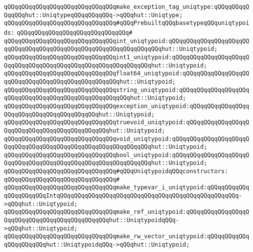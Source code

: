 \verb|qQQqqQQqqQQqqQQqqQQqqQQqqQQqqQQqmake_exception_tag_uniqtype:qQQqqQQqqQQqqQQqhut::UniqtypeqQQqqQQqqQQq->qQQqhut::Uniqtype;|\newline
\newline
\verb|qQQqqQQqqQQqqQQqqQQqqQQqqQQqqQQq#qQQqPrebuiltqQQqbasetypeqQQquniqtypoids:|\newline
\verb|qQQqqQQqqQQqqQQqqQQqqQQqqQQqqQQq#|\newline
\verb|qQQqqQQqqQQqqQQqqQQqqQQqqQQqqQQqint_uniqtypoid:qQQqqQQqqQQqqQQqqQQqqQQqqQQqqQQqqQQqqQQqqQQqqQQqqQQqqQQqqQQqqQQqqQQqhut::Uniqtypoid;|\newline
\verb|qQQqqQQqqQQqqQQqqQQqqQQqqQQqqQQqint1_uniqtypoid:qQQqqQQqqQQqqQQqqQQqqQQqqQQqqQQqqQQqqQQqqQQqqQQqqQQqqQQqqQQqqQQqhut::Uniqtypoid;|\newline
\verb|qQQqqQQqqQQqqQQqqQQqqQQqqQQqqQQqfloat64_uniqtypoid:qQQqqQQqqQQqqQQqqQQqqQQqqQQqqQQqqQQqqQQqqQQqqQQqqQQqhut::Uniqtypoid;|\newline
\verb|qQQqqQQqqQQqqQQqqQQqqQQqqQQqqQQqstring_uniqtypoid:qQQqqQQqqQQqqQQqqQQqqQQqqQQqqQQqqQQqqQQqqQQqqQQqqQQqqQQqhut::Uniqtypoid;|\newline
\verb|qQQqqQQqqQQqqQQqqQQqqQQqqQQqqQQqexception_uniqtypoid:qQQqqQQqqQQqqQQqqQQqqQQqqQQqqQQqqQQqqQQqqQQqhut::Uniqtypoid;|\newline
\verb|qQQqqQQqqQQqqQQqqQQqqQQqqQQqqQQqtruevoid_uniqtypoid:qQQqqQQqqQQqqQQqqQQqqQQqqQQqqQQqqQQqqQQqqQQqqQQqhut::Uniqtypoid;|\newline
\verb|qQQqqQQqqQQqqQQqqQQqqQQqqQQqqQQqvoid_uniqtypoid:qQQqqQQqqQQqqQQqqQQqqQQqqQQqqQQqqQQqqQQqqQQqqQQqqQQqqQQqqQQqqQQqhut::Uniqtypoid;|\newline
\verb|qQQqqQQqqQQqqQQqqQQqqQQqqQQqqQQqbool_uniqtypoid:qQQqqQQqqQQqqQQqqQQqqQQqqQQqqQQqqQQqqQQqqQQqqQQqqQQqqQQqqQQqqQQqhut::Uniqtypoid;|\newline
\newline
\verb|qQQqqQQqqQQqqQQqqQQqqQQqqQQqqQQq#qQQqUniqtypoidqQQqconstructors:|\newline
\verb|qQQqqQQqqQQqqQQqqQQqqQQqqQQqqQQq#|\newline
\verb|qQQqqQQqqQQqqQQqqQQqqQQqqQQqqQQqmake_typevar_i_uniqtypoid:qQQqqQQqqQQqqQQqqQQqqQQqIntqQQqqQQqqQQqqQQqqQQqqQQqqQQqqQQqqQQqqQQqqQQqqQQqqQQq->qQQqhut::Uniqtypoid;|\newline
\verb|qQQqqQQqqQQqqQQqqQQqqQQqqQQqqQQqmake_ref_uniqtypoid:qQQqqQQqqQQqqQQqqQQqqQQqqQQqqQQqqQQqqQQqqQQqqQQqhut::UniqtypoidqQQq->qQQqhut::Uniqtypoid;|\newline
\verb|qQQqqQQqqQQqqQQqqQQqqQQqqQQqqQQqmake_rw_vector_uniqtypoid:qQQqqQQqqQQqqQQqqQQqqQQqhut::UniqtypoidqQQq->qQQqhut::Uniqtypoid;|\newline
